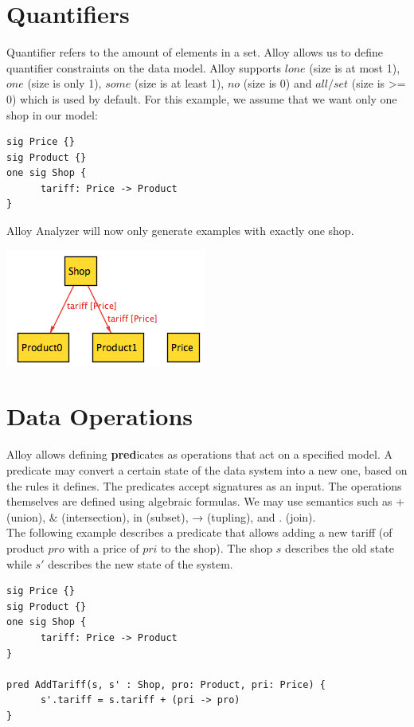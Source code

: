 \documentclass[oneside]{book}
\begin{document}
\section{Quantifiers}

Quantifier refers to the amount of elements in a set. Alloy allows us to define quantifier constraints on the data model. Alloy supports $lone$ (size is at most 1), $one$ (size is only 1), $some$ (size is at least 1), $no$ (size is 0) and $all/set$ (size is >= 0) which is used by default. For this example, we assume that we want only one shop in our model:

\begin{lstlisting}
sig Price {}
sig Product {}
one sig Shop {
	  tariff: Price -> Product
}
\end{lstlisting}

Alloy Analyzer will now only generate examples with exactly one shop. 

\begin{center}
\includegraphics[scale=0.6]{shop2}
\end{center}

\newpage

\section{Data Operations}
Alloy allows defining \textbf{pred}icates as operations that act on a specified model. A predicate may convert a certain state of the data system into a new one, based on the rules it defines. The predicates accept signatures as an input. The operations themselves are defined using algebraic formulas. We may use semantics such as + (union), \& (intersection), in (subset), → (tupling), and . (join).\\

The following example describes a predicate that allows adding a new tariff (of product $pro$ with a price of $pri$ to the shop). The shop $s$ describes the old state while $s'$ describes the new state of the system.

\begin{lstlisting}
sig Price {}
sig Product {}
one sig Shop {
	  tariff: Price -> Product
}

pred AddTariff(s, s' : Shop, pro: Product, pri: Price) {
	  s'.tariff = s.tariff + (pri -> pro)
}
\end{lstlisting}
\end{document}
